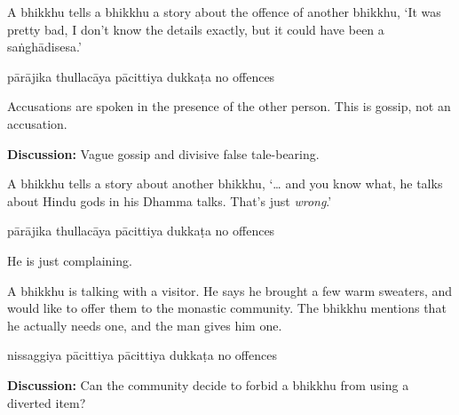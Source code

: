 \begin{exam}{\autoExamName}
\begin{problem*}
\begin{parts}
\item A bhikkhu tells a bhikkhu a story about the offence of another bhikkhu,
  `It was pretty bad, I don't know the details exactly, but it could have been a
  saṅghādisesa.'

  \bigskip

  \begin{answers}{5}
    \bChoices
     pārājika\eAns
     thullacāya\eAns
     pācittiya\eAns
     dukkaṭa\eAns
     no offences\eAns
    \eChoices
  \end{answers}

  \begin{solution}
    Accusations are spoken in the presence of the other person.
    This is gossip, not an accusation.
  \end{solution}

  \bigskip

  \textbf{Discussion:} Vague gossip and divisive false tale-bearing.

  \bigskip

\item A bhikkhu tells a story about another bhikkhu, `\ldots{} and you know
  what, he talks about Hindu gods in his Dhamma talks. That's just
  \textit{wrong}.'

  \bigskip

  \begin{answers}{5}
    \bChoices
     pārājika\eAns
     thullacāya\eAns
     pācittiya\eAns
     dukkaṭa\eAns
     no offences\eAns
    \eChoices
  \end{answers}

  \begin{solution}
    He is just complaining.
  \end{solution}

  \bigskip

\item A bhikkhu is talking with a visitor. He says he brought a few warm
  sweaters, and would like to offer them to the monastic community. The bhikkhu
  mentions that he actually needs one, and the man gives him one.

  \bigskip

  \begin{answers}{4}
    \bChoices
     nissaggiya pācittiya\eAns
     pācittiya\eAns
     dukkaṭa\eAns
     no offences\eAns
    \eChoices
  \end{answers}

  \bigskip

  \textbf{Discussion:} Can the community decide to forbid a bhikkhu from using a
  diverted item?

\end{parts}

\end{problem*}

\end{exam}

